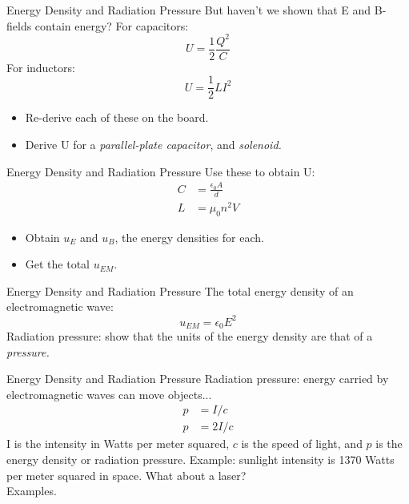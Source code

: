 \documentclass{beamer}
\begin{document}
\begin{frame}{Energy Density and Radiation Pressure}
But haven't we shown that E and B-fields contain energy?  For capacitors:
\begin{equation}
U = \frac{1}{2}\frac{Q^2}{C}
\end{equation}
For inductors:
\begin{equation}
U = \frac{1}{2}LI^2
\end{equation}
\begin{itemize}
\item Re-derive each of these on the board.
\item Derive U for a \textit{parallel-plate capacitor}, and \textit{solenoid.}
\end{itemize}
\end{frame}

\begin{frame}{Energy Density and Radiation Pressure}
Use these to obtain U:
\begin{align}
C &= \frac{\epsilon_0 A}{d} \\
L &= \mu_0 n^2 V
\end{align}
\begin{itemize}
\item Obtain $u_E$ and $u_B$, the energy densities for each.
\item Get the total $u_{EM}$.
\end{itemize}
\end{frame}

\begin{frame}{Energy Density and Radiation Pressure}
The total energy density of an electromagnetic wave:
\begin{equation}
u_{EM} = \epsilon_0 E^2
\end{equation}
Radiation pressure: show that the units of the energy density are that of a \textit{pressure.}
\end{frame}

\begin{frame}{Energy Density and Radiation Pressure}
Radiation pressure: energy carried by electromagnetic waves can move objects...
\begin{align}
p &= I/c \\
p &= 2I/c
\end{align}
I is the intensity in Watts per meter squared, $c$ is the speed of light, and $p$ is the energy density or radiation pressure.  Example: sunlight intensity is 1370 Watts per meter squared in space.  What about a laser? \\ \vspace{0.5cm}
\alert{Examples.}
\end{frame}
\end{document}
